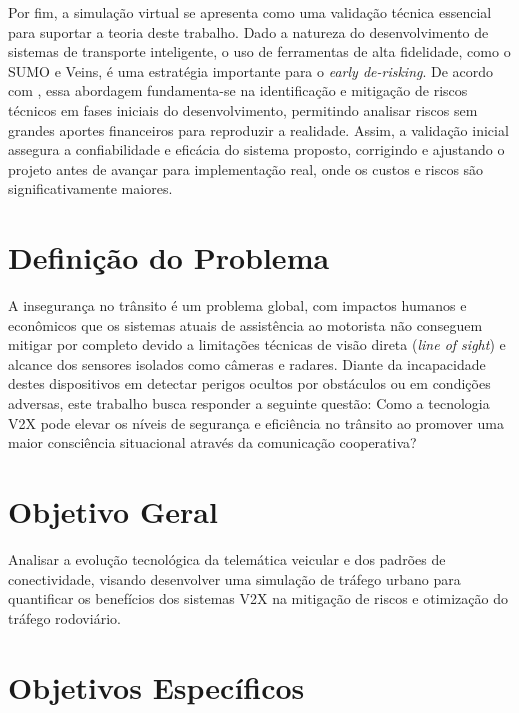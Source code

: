 Por fim, a simulação virtual se apresenta como uma validação técnica essencial para suportar a teoria deste trabalho. Dado a natureza do desenvolvimento de sistemas
de transporte inteligente, o uso de ferramentas de alta fidelidade, como o SUMO e Veins, é uma estratégia importante para o \textit{early de-risking}. De acordo
com \cite{ref:ota}, essa abordagem fundamenta-se na identificação e mitigação de riscos técnicos em fases iniciais do desenvolvimento, permitindo analisar riscos
sem grandes aportes financeiros para reproduzir a realidade. Assim, a validação inicial assegura a confiabilidade e eficácia do sistema proposto, corrigindo e
ajustando o projeto antes de avançar para implementação real, onde os custos e riscos são significativamente maiores.

\section{Definição do Problema}

A insegurança no trânsito é um problema global, com impactos humanos e econômicos que os sistemas atuais de assistência ao motorista não conseguem mitigar por
completo devido a limitações técnicas de visão direta (\textit{line of sight}) e alcance dos sensores isolados como câmeras e radares. Diante da incapacidade
destes dispositivos em detectar perigos ocultos por obstáculos ou em condições adversas, este trabalho busca responder a seguinte questão: Como a tecnologia V2X
pode elevar os níveis de segurança e eficiência no trânsito ao promover uma maior consciência situacional através da comunicação cooperativa? 

\section{Objetivo Geral}

Analisar a evolução tecnológica da telemática veicular e dos padrões de conectividade, visando desenvolver uma simulação de tráfego urbano para quantificar os
benefícios dos sistemas V2X na mitigação de riscos e otimização do tráfego rodoviário.

\section{Objetivos Específicos}

